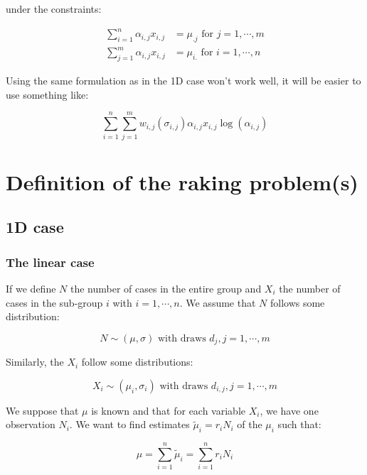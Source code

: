 under the constraints:

\begin{align*}
\sum_{i = 1}^n \alpha_{i,j} x_{i,j} &= \mu_{.j} \text{ for } j = 1 , \cdots , m \\
\sum_{j = 1}^m \alpha_{i,j} x_{i,j} &= \mu_{i.} \text{ for } i = 1 , \cdots , n
\end{align*}

Using the same formulation as in the 1D case won't work well, it will be easier to use something like:

\begin{equation*}
\sum_{i = 1}^n \sum_{j = 1}^m w_{i,j} \left( \sigma_{i,j} \right) \alpha_{i,j} x_{i,j} \log \left( \alpha_{i,j} \right)
\end{equation*}

\section{Definition of the raking problem(s)}

\subsection{1D case}

\subsubsection{The linear case}

If we define $N$ the number of cases in the entire group and $X_i$ the number of cases in the sub-group $i$ with $i = 1 , \cdots , n$. We assume that $N$ follows some distribution:

\begin{equation*}
N \sim \left( \mu , \sigma \right) \text{ with draws } d_j , j = 1 , \cdots , m
\end{equation*}

Similarly, the $X_i$ follow some distributions:

\begin{equation*}
X_i \sim \left( \mu_i , \sigma_i \right) \text{ with draws } d_{i,j} , j = 1 , \cdots , m
\end{equation*}

We suppose that $\mu$ is known and that for each variable $X_i$, we have one observation $N_i$. We want to find estimates $\tilde{\mu}_i = r_i N_i$ of the $\mu_i$ such that:

\begin{equation*}
\mu = \sum_{i = 1}^n \tilde{\mu}_i = \sum_{i = 1}^n r_i N_i
\end{equation*}

